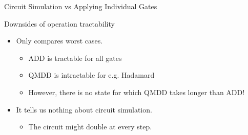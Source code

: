 \begin{frame}{Circuit Simulation vs Applying Individual Gates}


\begin{alertblock}{Downsides of operation tractability}
	\begin{itemize}
	\item Only compares worst cases.
	\begin{itemize}
	\item ADD is tractable for all gates
	\item QMDD is intractable for e.g. Hadamard
	\item However, there is no state for which QMDD takes longer than ADD!
	\end{itemize}
	\item<+-> It tells us nothing about circuit simulation.
\begin{itemize}
	\item The circuit might double at every step.
\end{itemize}
	\end{itemize}
\end{alertblock}



\end{frame}
